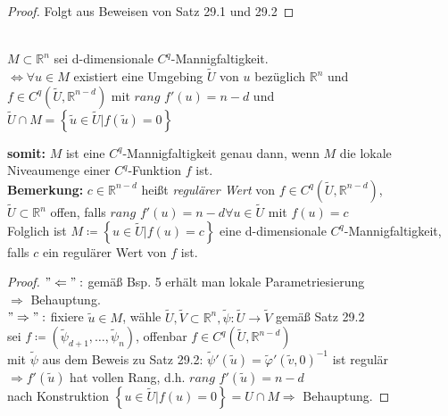 \begin{proof}
Folgt aus Beweisen von Satz 29.1 und 29.2
\end{proof}

\begin{theorem}
\mbox{} \\
$M \subset \mathbb{R}^n $ sei d-dimensionale $C^q$-Mannigfaltigkeit. \\
$\Longleftrightarrow \forall u \in M $ existiert eine Umgebing $\tilde{U}$ von $u$
bezüglich $\mathbb{R}^n$ und \\
$f \in C^q \left( \tilde{U}, \mathbb{R}^{n-d} \right)$ 
mit $\textit{rang } f' (u) = n-d $ und \\
$\tilde{U} \cap M = \left\lbrace \tilde{u} \in \tilde{U} | f (\tilde{u}) = 0 \right\rbrace $
\end{theorem}

\textbf{somit:} $M$ ist eine $C^q$-Mannigfaltigkeit genau dann, 
wenn $M$ die lokale Niveaumenge einer $C^q$-Funktion $f$ ist. \\

\textbf{Bemerkung:} $c \in \mathbb{R}^{n-d} $ heißt \textit{regulärer Wert} von
$f \in C^q \left( \tilde{U}, \mathbb{R}^{n-d} \right) $, \\
$\tilde{U} \subset \mathbb{R}^n $
offen, falls $\textit{rang } f' (u) = n-d \forall u \in \tilde{U} $ mit $f(u) = c $ \\
Folglich ist $M \coloneqq \left\lbrace u \in \tilde{U} | f(u) = c \right\rbrace $ 
eine d-dimensionale $C^q$-Mannigfaltigkeit, falls $c$ ein regulärer Wert von $f$ ist.

\begin{proof}
$"\Leftarrow":$ gemäß Bsp. 5 erhält man lokale Parametriesierung \\
$\Rightarrow$ Behauptung. \\
$"\Rightarrow":$ fixiere $\tilde{u} \in M$, 
wähle $\tilde{U}, \tilde{V} \subset \mathbb{R}^n, 
\tilde{\psi}: \tilde{U} \rightarrow \tilde{V} $ gemäß Satz 29.2 \\
sei $f \coloneqq \left( \tilde{\psi}_{d+1}, \ldots , \tilde{\psi}_n \right)$,
offenbar $f \in C^q \left(  \tilde{U}, \mathbb{R}^{n-d} \right) $ \\
mit $\tilde{\psi}$ aus dem Beweis zu Satz 29.2:
$\tilde{\psi}' (\tilde{u}) = \tilde{\varphi}' (\tilde{v}, 0)^{-1} $ ist regulär \\
$\Rightarrow f'(\tilde{u}) $ hat vollen Rang, d.h. $\textit{rang } f'(\tilde{u}) = n-d $ \\
nach Konstruktion $ \left\lbrace u \in \tilde{U} | f(u) = 0 \right\rbrace = U \cap M
\Rightarrow $ Behauptung.
\end{proof}

